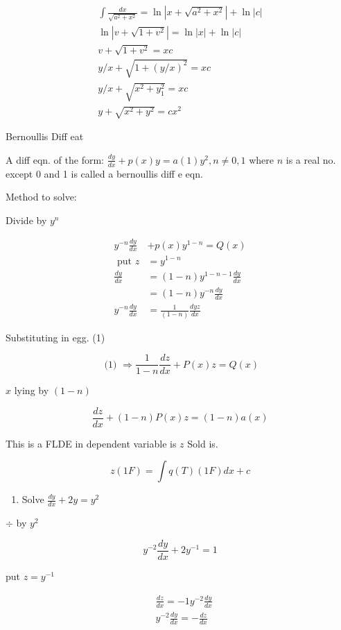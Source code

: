\documentclass[10pt]{article}
\begin{document}
\begin{gather*}
\int \frac{d x}{\sqrt{a^{2}+x^{2}}}=\ln \left|x+\sqrt{a^{2}+x^{2}}\right|+\ln |c|  \tag{cs}\\
\ln \left|v+\sqrt{1+v^{2}}\right|=\ln |x|+\ln |c| \\
v+\sqrt{1+v^{2}}=x c \\
y / x+\sqrt{1+(y / x)^{2}}=x c \\
y / x+\sqrt{x^{2}+y_{1}^{2}}=x c \\
y+\sqrt{x^{2}+y^{2}}=c x^{2}
\end{gather*}


Bernoullis Diff eat

A diff eqn. of the form: $\frac{d y}{d x}+p(x) y=a(1) y^{2}, n \neq 0,1$ where $n$ is a real no. except 0 and 1 is called a bernoullis diff e eqn.

Method to solve:

Divide by $y^{n}$

$$
\begin{aligned}
y^{-n} \frac{d y}{d x} & +p(x) y^{1-n}=Q(x) \\
\text { put } z & =y^{1-n} \\
\frac{d y}{d x} & =(1-n) y^{1-n-1} \frac{d y}{d x} \\
& =(1-n) y^{-n} \frac{d y}{d x} \\
y^{-n} \frac{d y}{d x} & =\frac{1}{(1-n)} \frac{d y z}{d x}
\end{aligned}
$$

Substituting in egg. (1)

$$
\text { (1) } \Rightarrow \frac{1}{1-n} \frac{d z}{d x}+P(x) z=Q(x)
$$

$x$ lying by $(1-n)$

$$
\frac{d z}{d x}+(1-n) P(x) z=(1-n) a(x)
$$

This is a FLDE in dependent variable is $z$ Sold is.

$$
z(1 F)=\int q(T)(1 F) d x+c
$$

\begin{enumerate}
  \item Solve $\frac{d y}{d x}+2 y=y^{2}$
\end{enumerate}

$\div$ by $y^{2}$


\begin{equation*}
y^{-2} \frac{d y}{d x}+2 y^{-1}=1 \tag{1}
\end{equation*}


put $z=y^{-1}$

$$
\begin{aligned}
& \frac{d z}{d x}=-1 y^{-2} \frac{d y}{d x} \\
& y^{-2} \frac{d y}{d x}=-\frac{d z}{d x}
\end{aligned}
$$
\end{document}
